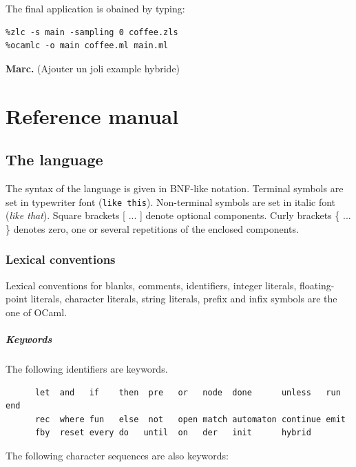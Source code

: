 \documentclass[11pt,titlepage,twoside]{report}
\newcommand{\ocaml}{{\sf OCaml}}
\newcommand{\Marc}[1]{{\bf Marc.} ({#1})}
\newcommand{\term}[1]{{\tt #1}}
\newcommand{\nterm}[1]{{\em #1}}
\begin{document}
The final application is obained by typing:

\begin{verbatim}
%zlc -s main -sampling 0 coffee.zls
%ocamlc -o main coffee.ml main.ml
\end{verbatim}

\Marc{Ajouter un joli example hybride}

\cleardoublepage

\part{Reference manual}
\label{reference-manual}
\cleardoublepage
\chapter{The language}


The syntax of the language is given in BNF-like notation. Terminal
symbols are set in typewriter font (\term{like this}). Non-terminal symbols
are set in italic font (\nterm{like that}). Square brackets [ ... ] denote
optional components. Curly brackets \{ ... \} denotes zero, one or several
repetitions of the enclosed components.


\section{Lexical conventions}

Lexical conventions for blanks, comments, identifiers, integer
literals, floating-point literals, character literals, string
literals, prefix and infix symbols are the one of \ocaml.

\subsubsection{Keywords}
The following identifiers are keywords.

\begin{verbatim}
      let  and   if    then  pre   or   node  done      unless   run   end
      rec  where fun   else  not   open match automaton continue emit
      fby  reset every do   until  on   der   init      hybrid
\end{verbatim}
The following character sequences are also keywords:
\end{document}
